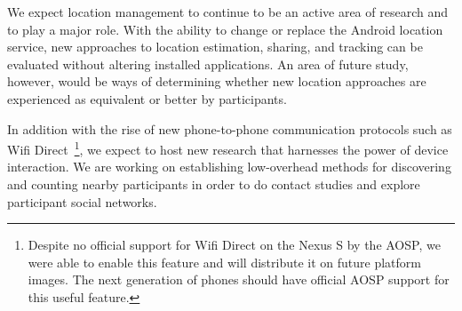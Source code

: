 We expect location management to continue to be an active area of research
and \PhoneLab{} to play a major role. With the ability to change or replace
the Android location service, new approaches to location estimation, sharing,
and tracking can be evaluated without altering installed applications. An
area of future study, however, would be ways of determining whether new
location approaches are experienced as equivalent or better by \PhoneLab{}
participants.

In addition with the rise of new phone-to-phone communication protocols such
as Wifi Direct~\cite{wifi-direct}\footnote{Despite no official support for Wifi
Direct on the Nexus S by the AOSP, we were able to enable this feature and
will distribute it on future platform images. The next generation of
\PhoneLab{} phones should have official AOSP support for this useful
feature.}, we expect \PhoneLab{} to host new research that harnesses the
power of device interaction. We are working on establishing low-overhead
methods for discovering and counting nearby \PhoneLab{} participants in order
to do contact studies and explore participant social networks.
